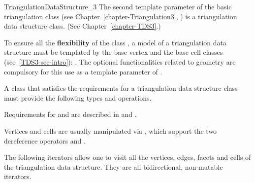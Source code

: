 \begin{ccRefConcept}{TriangulationDataStructure_3}
The second template parameter of the basic triangulation class
(see Chapter~\ref{chapter-Triangulation3},
)
 is a triangulation data structure class. (See
Chapter~\ref{chapter-TDS3}.)  

To ensure all the \textbf{flexibility} of the class , a
model of a triangulation data structure must be templated by the base vertex
and the base cell classes (see~\ref{TDS3-sec-intro}):
.
The optional functionalities related to geometry are compulsory for
this use as a template parameter of .

\bigskip

A class that satisfies the requirements for a triangulation data structure
class must provide the following types and operations. 

\ccTypes
{}
\ccThreeToTwo

\ccGlue
{}
Requirements for  and  are described in
 and
 .

\ccGlue
{} 

Vertices and cells are usually manipulated via , which support
the two dereference operators  and .

\ccGlue
{}

The following iterators allow one to visit all the vertices, edges, facets
and cells of the triangulation data structure. They are all
bidirectional, non-mutable iterators.

\ccGlue
{}
\ccGlue
{}
\ccGlue
{}


\end{ccRefConcept}
